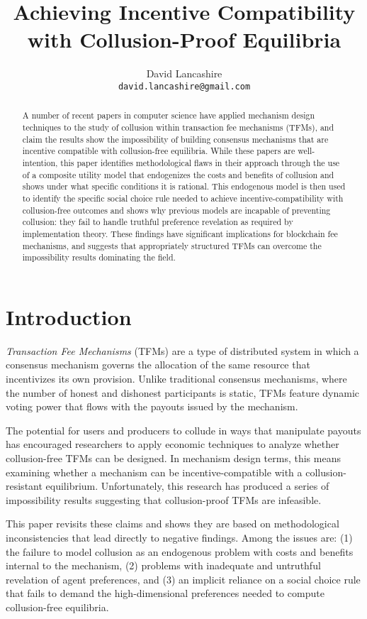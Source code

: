 \documentclass[oneside]{article}   	%
\title{Achieving Incentive Compatibility with Collusion-Proof Equilibria}
\author{
  David Lancashire\\
  \texttt{david.lancashire@gmail.com}\\
}
\begin{document}
\maketitle


\begin{abstract}
A number of recent papers in computer science have applied mechanism design techniques to the study of collusion within transaction fee mechanisms (TFMs), and claim the results show the impossibility of building consensus mechanisms that are incentive compatible with collusion-free equilibria. While these papers are well-intention, this paper identifies methodological flaws in their approach through the use of a composite utility model that endogenizes the costs and benefits of collusion and shows under what specific conditions it is rational. This endogenous model is then used to identify the specific social choice rule needed to achieve incentive-compatibility with collusion-free outcomes and shows why previous models are incapable of preventing collusion: they fail to handle truthful preference revelation as required by implementation theory. These findings have significant implications for blockchain fee mechanisms, and suggests that appropriately structured TFMs can overcome the impossibility results dominating the field.
\end{abstract}

\section{Introduction \label{sec::introduction}}

\emph{Transaction Fee Mechanisms} (TFMs) are a type of distributed system in which a consensus mechanism governs the allocation of the same resource that incentivizes its own provision. Unlike traditional consensus mechanisms, where the number of honest and dishonest participants is static, TFMs feature dynamic voting power that flows with the payouts issued by the mechanism.

The potential for users and producers to collude in ways that manipulate payouts has encouraged researchers to apply economic techniques to analyze whether collusion-free TFMs can be designed. In mechanism design terms, this means examining whether a mechanism can be incentive-compatible with a collusion-resistant equilibrium. Unfortunately, this research has produced a series of impossibility results suggesting that collusion-proof TFMs are infeasible.

This paper revisits these claims and shows they are based on methodological inconsistencies that lead directly to negative findings. Among the issues are: (1) the failure to model collusion as an endogenous problem with costs and benefits internal to the mechanism, (2) problems with inadequate and untruthful revelation of agent preferences, and (3) an implicit reliance on a social choice rule that fails to demand the high-dimensional preferences needed to compute collusion-free equilibria.
\end{document}
